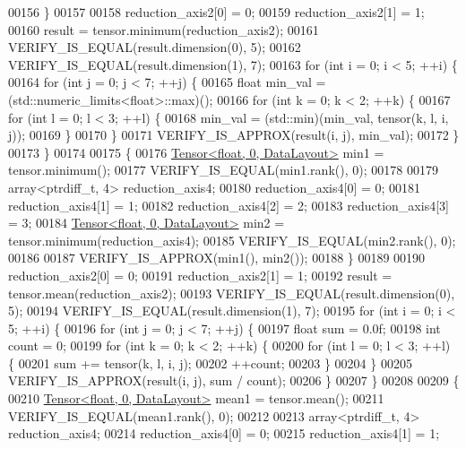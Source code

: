\begin{DoxyCode}
00156   \}
00157 
00158   reduction\_axis2[0] = 0;
00159   reduction\_axis2[1] = 1;
00160   result = tensor.minimum(reduction\_axis2);
00161   VERIFY\_IS\_EQUAL(result.dimension(0), 5);
00162   VERIFY\_IS\_EQUAL(result.dimension(1), 7);
00163   \textcolor{keywordflow}{for} (\textcolor{keywordtype}{int} i = 0; i < 5; ++i) \{
00164     \textcolor{keywordflow}{for} (\textcolor{keywordtype}{int} j = 0; j < 7; ++j) \{
00165       \textcolor{keywordtype}{float} min\_val = (std::numeric\_limits<float>::max)();
00166       \textcolor{keywordflow}{for} (\textcolor{keywordtype}{int} k = 0; k < 2; ++k) \{
00167         \textcolor{keywordflow}{for} (\textcolor{keywordtype}{int} l = 0; l < 3; ++l) \{
00168           min\_val = (std::min)(min\_val, tensor(k, l, i, j));
00169         \}
00170       \}
00171       VERIFY\_IS\_APPROX(result(i, j), min\_val);
00172     \}
00173   \}
00174 
00175   \{
00176     \hyperlink{class_eigen_1_1_tensor}{Tensor<float, 0, DataLayout>} min1 = tensor.minimum();
00177     VERIFY\_IS\_EQUAL(min1.rank(), 0);
00178 
00179     array<ptrdiff\_t, 4> reduction\_axis4;
00180     reduction\_axis4[0] = 0;
00181     reduction\_axis4[1] = 1;
00182     reduction\_axis4[2] = 2;
00183     reduction\_axis4[3] = 3;
00184     \hyperlink{class_eigen_1_1_tensor}{Tensor<float, 0, DataLayout>} min2 = tensor.minimum(reduction\_axis4);
00185     VERIFY\_IS\_EQUAL(min2.rank(), 0);
00186 
00187     VERIFY\_IS\_APPROX(min1(), min2());
00188   \}
00189 
00190   reduction\_axis2[0] = 0;
00191   reduction\_axis2[1] = 1;
00192   result = tensor.mean(reduction\_axis2);
00193   VERIFY\_IS\_EQUAL(result.dimension(0), 5);
00194   VERIFY\_IS\_EQUAL(result.dimension(1), 7);
00195   \textcolor{keywordflow}{for} (\textcolor{keywordtype}{int} i = 0; i < 5; ++i) \{
00196     \textcolor{keywordflow}{for} (\textcolor{keywordtype}{int} j = 0; j < 7; ++j) \{
00197       \textcolor{keywordtype}{float} sum = 0.0f;
00198       \textcolor{keywordtype}{int} count = 0;
00199       \textcolor{keywordflow}{for} (\textcolor{keywordtype}{int} k = 0; k < 2; ++k) \{
00200         \textcolor{keywordflow}{for} (\textcolor{keywordtype}{int} l = 0; l < 3; ++l) \{
00201           sum += tensor(k, l, i, j);
00202           ++count;
00203         \}
00204       \}
00205       VERIFY\_IS\_APPROX(result(i, j), sum / count);
00206     \}
00207   \}
00208 
00209   \{
00210     \hyperlink{class_eigen_1_1_tensor}{Tensor<float, 0, DataLayout>} mean1 = tensor.mean();
00211     VERIFY\_IS\_EQUAL(mean1.rank(), 0);
00212 
00213     array<ptrdiff\_t, 4> reduction\_axis4;
00214     reduction\_axis4[0] = 0;
00215     reduction\_axis4[1] = 1;

\end{DoxyCode}
